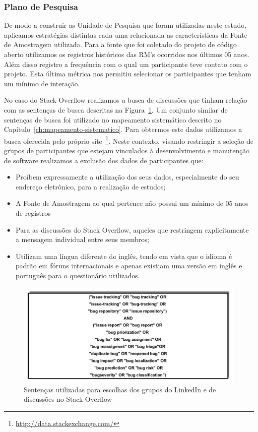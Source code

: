 \subsubsection{Plano de Pesquisa}

De modo a construir as Unidade de Pesquisa que foram utilizadas neste estudo,
aplicamos estratégias distintas cada uma relacionada as características da Fonte
de Amostragem utilizada. Para a fonte que foi coletado do projeto de código
aberto utilizamos os registros históricos das RM's ocorridos nos últimos 05
anos. Além disso registro a frequência com o qual um participante teve contato
com o projeto. Esta última métrica nos permitiu selecionar os participantes que
tenham um mínimo de interação.

No caso do Stack Overflow realizamos a busca de discussões que tinham relação
com  as sentenças de busca descritas na Figura~\ref{fig:setencas-grupos}. Um
conjunto similar de sentenças de busca foi utilizado no mapeamento sistemático
descrito no Capítulo~\ref{ch:mapeamento-sistematico}. Para obtermos este dados
utilizamos a busca oferecida pelo próprio
site~\footnote{\url{http://data.stackexchange.com/}}. Neste contexto, visando
restringir a seleção de grupos de participantes que estejam vinculados à
desenvolvimento e manutenção de software realizamos a exclusão dos dados de
participantes que:

\begin{itemize}
	\item Proíbem expressamente a utilização dos seus dados, especialmente do
		seu endereço eletrônico, para a realização de estudos;
	\item A Fonte de Amostragem ao qual pertence não possui um mínimo de 05 anos
		de registros
	\item Para as discussões do Stack Overflow, aqueles que restringem
		explicitamente a mensagem individual entre seus membros;
    \item Utilizam uma língua diferente do inglês, tendo em vista que o idioma
		 é padrão em fóruns internacionais e apenas existiam uma versão em
		inglês e português para o questionário utilizados.
\end{itemize}

\begin{figure}[htpb]
	\centering
	\includegraphics[width=0.8\linewidth]{./chapter-pesquisa-com-profissionais/img/setencas-grupos.pdf}
	\caption{Sentenças utilizadas para escolhas dos grupos do LinkedIn e de
		discussões no Stack Overflow}
\label{fig:setencas-grupos}
\end{figure}

